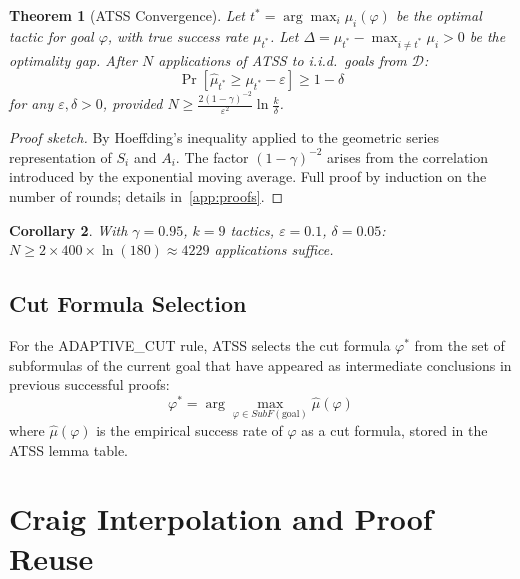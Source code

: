\documentclass[conference]{IEEEtran}
\newtheorem{theorem}{Theorem}[section]
\newtheorem{corollary}[theorem]{Corollary}
\newcommand{\ATSS}{\textsc{ATSS}}
\begin{document}
\begin{theorem}[ATSS Convergence]
  \label{thm:atss-convergence}
  Let $t^* = \arg\max_i \mu_i(\varphi)$ be the optimal tactic for goal
  $\varphi$, with true success rate $\mu_{t^*}$.  Let
  $\Delta = \mu_{t^*} - \max_{i \neq t^*} \mu_i > 0$ be the optimality gap.
  After $N$ applications of \ATSS{} to i.i.d.\ goals from $\mathcal{D}$:
  \begin{equation}
    \Pr\!\left[\hat{\mu}_{t^*} \geq \mu_{t^*} - \varepsilon\right]
    \geq 1 - \delta
  \end{equation}
  for any $\varepsilon, \delta > 0$, provided
  $N \geq \frac{2(1-\gamma)^{-2}}{\varepsilon^2} \ln \frac{k}{\delta}$.
\end{theorem}
\begin{proof}[Proof sketch]
  By Hoeffding's inequality applied to the geometric series representation of
  $S_i$ and $A_i$.  The factor $(1-\gamma)^{-2}$ arises from the correlation
  introduced by the exponential moving average.  Full proof by induction on the
  number of rounds; details in~\cref{app:proofs}.
\end{proof}

\begin{corollary}
  With $\gamma = 0.95$, $k = 9$ tactics, $\varepsilon = 0.1$, $\delta = 0.05$:
  $N \geq 2 \times 400 \times \ln(180) \approx 4229$ applications suffice.
\end{corollary}

\subsection{Cut Formula Selection}

For the ADAPTIVE\_CUT rule, \ATSS{} selects the cut formula $\varphi^*$
from the set of subformulas of the current goal that have appeared as
intermediate conclusions in previous successful proofs:
\begin{equation}
  \varphi^* = \arg\max_{\varphi \in \mathit{SubF}(\text{goal})}
    \hat{\mu}(\varphi)
\end{equation}
where $\hat{\mu}(\varphi)$ is the empirical success rate of $\varphi$ as a
cut formula, stored in the \ATSS{} lemma table.

\section{Craig Interpolation and Proof Reuse}
\label{sec:interpolation}
\end{document}
